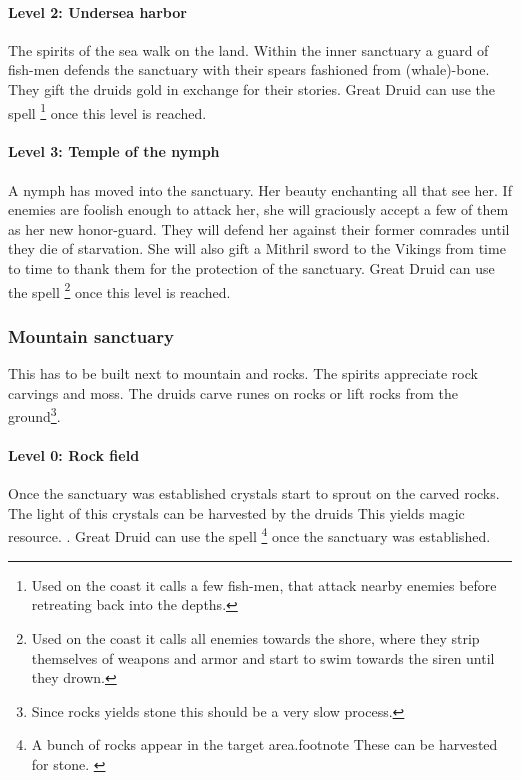 \paragraph{Level 2: Undersea harbor}
The spirits of the sea walk on the land. Within the inner sanctuary a guard of
fish-men defends the sanctuary with their spears fashioned from (whale)-bone.
They gift the druids gold in exchange for their stories. Great Druid can use
the spell \footnote{ Used on the coast it calls a few
	fish-men, that attack nearby enemies before retreating back into the depths. }
once this level is reached.

\paragraph{Level 3: Temple of the nymph}
A nymph has moved into the sanctuary. Her beauty enchanting all that see her.
If enemies are foolish enough to attack her, she will graciously accept a few
of them as her new honor-guard. They will defend her against their former
comrades until they die of starvation. She will also gift a Mithril sword to
the \gls{Vikings} from time to time to thank them for the protection of the
sanctuary. Great Druid can use the spell \footnote{ Used
	on the coast it calls all enemies towards the shore, where they strip
	themselves of weapons and armor and start to swim towards the siren until they
	drown. } once this level is reached.

\subsubsection{Mountain sanctuary}\label{ch:Tribes:Vikings:Religion:Mountain}
This has to be built next to mountain and rocks. The spirits appreciate rock
carvings and moss. The druids carve runes on rocks or lift rocks from the
ground\footnote{ Since rocks yields stone this should be a very slow process.
}.

\paragraph{Level 0: Rock field}
Once the sanctuary was established crystals start to sprout on the carved
rocks. The light of this crystals can be harvested by the druids{ This yields
		magic resource. }. Great Druid can use the spell \footnote{ A bunch of rocks appear in the target area.footnote{ These can
			be harvested for stone. } } once the sanctuary was established.


